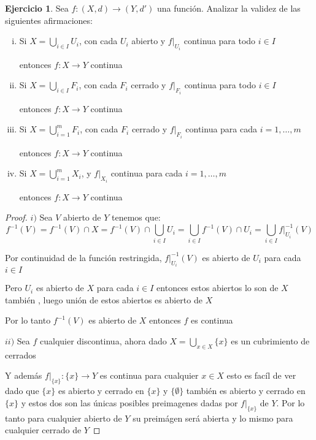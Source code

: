 \documentclass[12pt]{article}
\newcommand{\ra}{\rightarrow}
\theoremstyle{definition}
\newtheorem{ej}{Ejercicio}
\begin{document}
 \begin{ej}
   Sea $f:(X,d) \ra (Y,d')$ una función. Analizar la validez de las siguientes afirmaciones:
   \begin{enumerate}[i.]
     \item Si $X = \bigcup_{i \in I} U_i$, con cada $U_i$ abierto y $f|_{U_i}$ continua para todo $i \in I$

       entonces $f:X \ra Y$ continua

       \item Si $X = \bigcup_{i \in I} F_i$, con cada $F_i$ cerrado y $f|_{F_i}$ continua para todo $i \in I$

       entonces $f:X \ra Y$ continua

     \item Si $X = \bigcup_{i = 1}^m F_i$, con cada $F_i$ cerrado y $f|_{F_i}$ continua para cada $i = 1, \dots , m$

       entonces $f:X \ra Y$ continua

     \item Si $X = \bigcup_{i = 1}^m X_i$,  y $f|_{X_i}$ continua para cada $i = 1, \dots , m$ 

       entonces $f:X \ra Y$ continua

   \end{enumerate}
\begin{proof}
$i)$  Sea $V$ abierto de $Y$ tenemos que:
$$ f^{-1}(V) = f^{-1}(V) \cap X = f^{-1}(V) \cap \bigcup_{i \in I} U_i = \bigcup_{i \in I} f^{-1}(V) \cap U_i = \bigcup_{i\in I}f|_{U_i}^{-1}(V)$$

Por continuidad de la función restringida, $f|_{U_i}^{-1}(V)$ es abierto de $U_i$ para cada $i \in I$

Pero $U_i$ es abierto de $X$ para cada $i \in I$ entonces estos abiertos lo son de $X$ también , luego unión de estos abiertos es abierto de $X$ 

Por lo tanto $f^{-1}(V)$ es abierto de $X$ entonces $f$ es continua

$ii)$ Sea $f$ cualquier discontinua, ahora dado $X = \bigcup_{x \in X} \{x\}$ es un cubrimiento de cerrados

Y además $f|_{\{x\}}: \{x\} \ra Y$ es continua para cualquier $x \in X$ esto es facíl de ver dado que $\{x\}$ es abierto y cerrado en $\{x\}$ y $\{\emptyset \}$ también es abierto y cerrado en $\{x\}$ y estos dos son las únicas posibles preimagenes dadas por $f|_{\{x\}}$ de $Y$. Por lo tanto para cualquier abierto de $Y$ su preimágen será abierta y lo mismo para cualquier cerrado de $Y$


\end{proof}
\end{ej}
\end{document}
